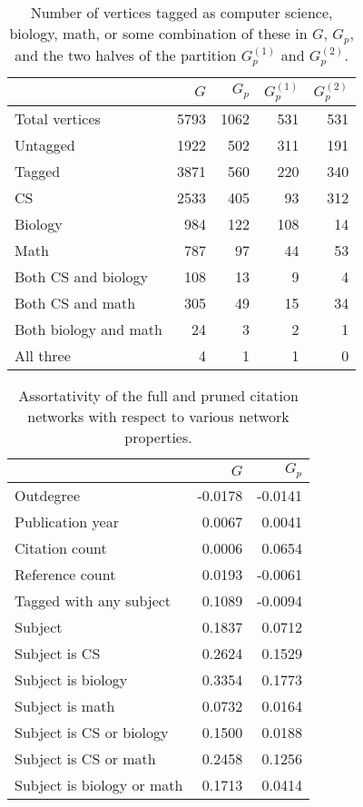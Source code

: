 \documentclass[12pt]{thesis}
\theoremstyle{plain}
\theoremstyle{definition}
\theoremstyle{remark}
\begin{document}
\begin{table}[t]
\centering
\begin{tabular}{|l|r|r|r|r|}
\hline & $G$ & $G_p$ & $G_p^{(1)}$ & $G_p^{(2)}$ \\ \hline
Total vertices & 5793 & 1062 & 531 & 531 \\ \hline
Untagged & 1922 & 502 & 311 & 191 \\ \hline
Tagged & 3871 & 560 & 220 & 340 \\ \hline
CS & 2533 & 405 & 93 & 312 \\ \hline
Biology & 984 & 122 & 108 & 14 \\ \hline
Math & 787 & 97 & 44 & 53 \\ \hline
Both CS and biology & 108 & 13 & 9 & 4 \\ \hline
Both CS and math & 305 & 49 & 15 & 34 \\ \hline
Both biology and math & 24 & 3 & 2 & 1 \\ \hline
All three & 4 & 1 & 1 & 0 \\ \hline
\end{tabular}
\caption{Number of vertices tagged as computer science, biology, math, or some combination of these in $G$, $G_p$, and the two halves of the partition $G_p^{(1)}$ and $G_p^{(2)}$.}
\label{tab:subject_counts}
\end{table}



\begin{table}[h]
\centering
\begin{tabular}{|l|r|r|}
\hline
 & $G$ & $G_p$ \\ \hline\hline
Outdegree & -0.0178 & -0.0141 \\ \hline
Publication year & 0.0067 & 0.0041 \\ \hline
Citation count & 0.0006 & 0.0654 \\ \hline
Reference count & 0.0193 & -0.0061 \\ \hline
Tagged with any subject & 0.1089 & -0.0094 \\ \hline
Subject & 0.1837 & 0.0712 \\ \hline
Subject is CS & 0.2624 & 0.1529 \\ \hline
Subject is biology & 0.3354 & 0.1773 \\ \hline
Subject is math & 0.0732 & 0.0164 \\ \hline
Subject is CS or biology & 0.1500 & 0.0188 \\ \hline
Subject is CS or math & 0.2458 & 0.1256 \\ \hline
Subject is biology or math & 0.1713 & 0.0414 \\ \hline
\end{tabular}
\caption{Assortativity of the full and pruned citation networks with respect to various network properties.}
\label{tab:assortativity}
\end{table}
\end{document}
